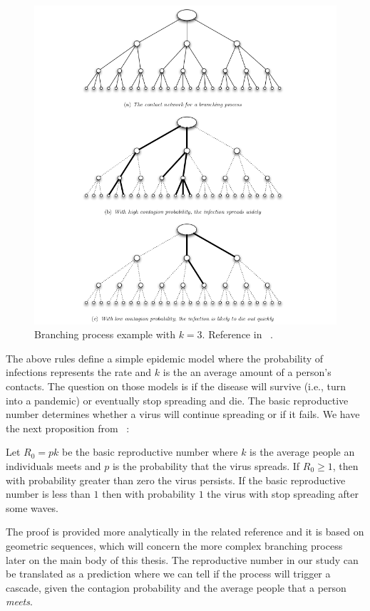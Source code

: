 \begin{figure}[t]
	\centering
	\includegraphics[width=.90\textwidth]{Figures/Selection_004.png}
	
	\caption{Branching process example with $k=3$. Reference in ~\cite{Kleinberg}.}
	
	\label{fig:branchProc}
\end{figure}

The above rules define a simple epidemic model where the probability of infections represents the rate and $k$ is the an average amount of a person's contacts. The question on those models is if the disease will survive (i.e., turn into a pandemic) or eventually stop spreading and die. The basic reproductive number determines whether a virus will continue spreading or if it fails. We have the next proposition from ~\cite{Kleinberg}:

\begin{prop}
	Let $R_0 = p k $ be the basic reproductive number where $k$ is the average people an individuals meets and $p$ is the probability that the virus spreads. If $R_0 \geq 1$, then with probability greater than zero the virus persists. If the basic reproductive number is less than $1$ then with probability $1$ the virus with stop spreading after some waves.
\end{prop}

The proof is provided more analytically in the related reference and it is based on geometric sequences, which will concern the more complex branching process later on the main body of this thesis. The reproductive number in our study can be translated as a prediction where we can tell if the process will trigger a cascade, given the contagion probability and the average people that a person \textit{meets}.

